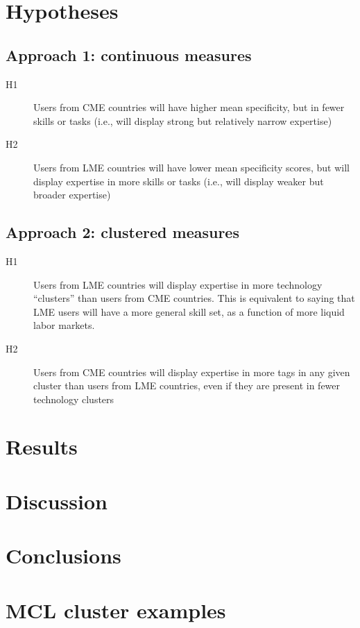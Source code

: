 \documentclass[11pt]{article}
\begin{document}
\section{Hypotheses}
\label{sec:hypotheses}

\subsection{Approach 1: continuous measures}
\label{sec:appr-1:-cont}

\begin{description}
\item[H1] Users from CME countries will have higher mean specificity,
  but in fewer skills or tasks (i.e., will display strong but
  relatively narrow expertise)
\item[H2] Users from LME countries will have lower mean specificity
  scores, but will display expertise in more skills or tasks (i.e.,
  will display weaker but broader expertise)
\end{description}

\subsection{Approach 2: clustered measures}
\label{sec:appr-2:-clust}

\begin{description}
\item[H1] Users from LME countries will display expertise in more
  technology ``clusters'' than users from CME countries. This is
  equivalent to saying that LME users will have a more general skill
  set, as a function of more liquid labor markets.
\item[H2] Users from CME countries will display expertise in more tags
  in any given cluster than users from LME countries, even if they are
  present in fewer technology clusters
\end{description}



\section{Results}
\label{sec:results}

\section{Discussion}
\label{sec:discussion}

\section{Conclusions}
\label{sec:conclusions}

\appendix
\appendixpage

\section{MCL cluster examples}
\label{sec:mcl-cluster-examples}



\FloatBarrier


\end{document}
